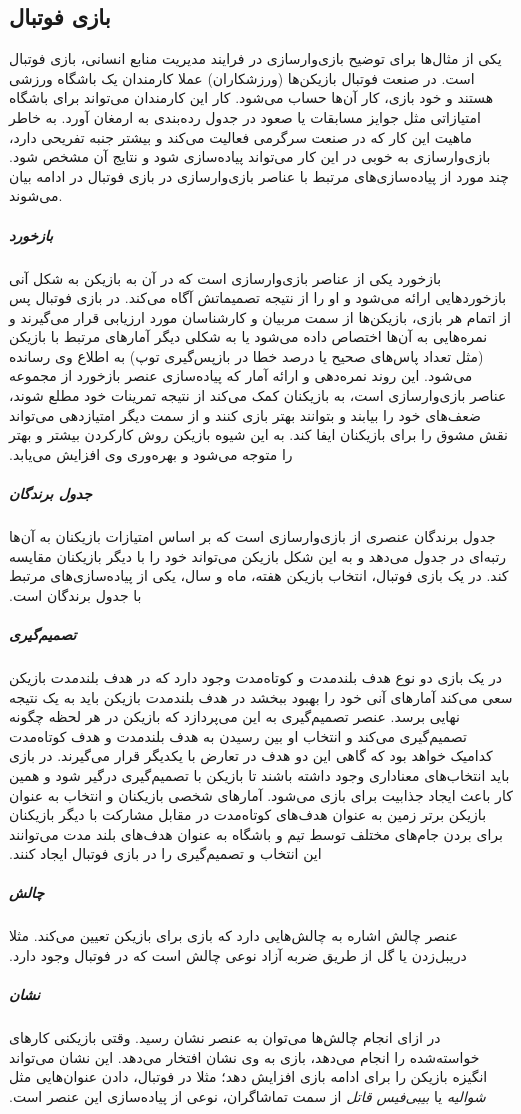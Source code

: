 \subsection{بازی فوتبال}
یکی از مثال‌ها برای توضیح بازی‌وارسازی در فرایند مدیریت منابع انسانی، بازی فوتبال است. در صنعت فوتبال بازیکن‌ها (ورزشکاران) عملا کارمندان یک باشگاه ورزشی هستند و خود بازی، کار آن‌ها حساب می‌شود. کار این کارمندان می‌تواند برای باشگاه امتیازاتی مثل جوایز مسابقات یا صعود در جدول رده‌بندی به ارمغان آورد.
به خاطر ماهیت این کار که در صنعت سرگرمی فعالیت می‌کند و بیشتر جنبه تفریحی دارد، بازی‌وارسازی به خوبی در این کار می‌تواند پیاده‌سازی شود و نتایج آن مشخص شود. چند مورد از پیاده‌سازی‌های مرتبط با عناصر بازی‌وارسازی در بازی فوتبال در ادامه بیان می‌شوند.
\subparagraph{بازخورد}‫
بازخورد یکی از عناصر بازی‌وارسازی است که در آن به بازیکن به شکل آنی بازخوردهایی ارائه می‌شود و او را از نتیجه تصمیماتش آگاه می‌کند. در بازی فوتبال پس از اتمام هر بازی، بازیکن‌ها از سمت مربیان و کارشناسان مورد ارزیابی قرار می‌گیرند و نمره‌هایی به آن‌ها اختصاص داده می‌شود یا به شکلی دیگر آمارهای مرتبط با بازیکن (مثل تعداد پاس‌های صحیح یا درصد خطا در بازپس‌گیری توپ) به اطلاع وی رسانده می‌شود. این روند نمره‌دهی و ارائه آمار که پیاده‌سازی عنصر بازخورد از مجموعه عناصر بازی‌وارسازی است، به بازیکنان کمک می‌کند از نتیجه تمرینات خود مطلع شوند، ضعف‌های خود را بیابند و بتوانند بهتر بازی کنند و از سمت دیگر امتیازدهی می‌تواند نقش مشوق را برای بازیکنان ایفا کند. به این شیوه بازیکن روش کارکردن بیشتر و بهتر را متوجه می‌شود و بهره‌وری وی افزایش می‌یابد.
\subparagraph{جدول برندگان}‫
جدول برندگان عنصری از بازی‌وارسازی است که بر اساس امتیازات بازیکنان به آن‌ها رتبه‌ای در جدول می‌دهد و به این شکل بازیکن می‌تواند خود را با دیگر بازیکنان مقایسه کند. در یک بازی فوتبال، انتخاب بازیکن هفته، ماه و سال، یکی از پیاده‌سازی‌های مرتبط با جدول برندگان است.
\subparagraph{تصمیم‌گیری}‫
در یک بازی دو نوع هدف بلندمدت و کوتاه‌مدت وجود دارد که در هدف بلندمدت بازیکن سعی می‌کند آمارهای آنی خود را بهبود ببخشد در هدف بلندمدت بازیکن باید به یک نتیجه نهایی برسد. عنصر تصمیم‌گیری به این می‌پردازد که بازیکن در هر لحظه چگونه تصمیم‌گیری می‌کند و انتخاب او بین رسیدن به هدف بلندمدت و هدف کوتاه‌مدت کدامیک خواهد بود که گاهی این دو هدف در تعارض با یکدیگر قرار می‌گیرند. در بازی باید انتخاب‌های معناداری وجود داشته باشند تا بازیکن با تصمیم‌گیری درگیر شود و همین کار باعث ایجاد جذابیت برای بازی می‌شود. آمارهای شخصی بازیکنان و انتخاب به عنوان بازیکن برتر زمین به عنوان هدف‌های کوتاه‌مدت در مقابل مشارکت با دیگر بازیکنان برای بردن جام‌های مختلف توسط تیم و باشگاه به عنوان هدف‌های بلند مدت می‌توانند این انتخاب و تصمیم‌گیری را در بازی فوتبال ایجاد کنند.
\subparagraph{چالش}‫
عنصر چالش اشاره به چالش‌هایی دارد که بازی برای بازیکن تعیین می‌کند. مثلا دریبل‌زدن یا گل از طریق ضربه آزاد نوعی چالش است که در فوتبال وجود دارد.
\subparagraph{نشان}‫
در ازای انجام چالش‌ها می‌توان به عنصر نشان رسید. وقتی بازیکنی کارهای خواسته‌شده را انجام می‌دهد، بازی به وی نشان افتخار می‌دهد. این نشان می‌تواند انگیزه بازیکن را برای ادامه بازی افزایش دهد؛ مثلا در فوتبال، دادن عنوان‌هایی مثل \emph{شوالیه} یا \emph{بیبی‌فیس قاتل} از سمت تماشاگران، نوعی از پیاده‌سازی این عنصر است.
